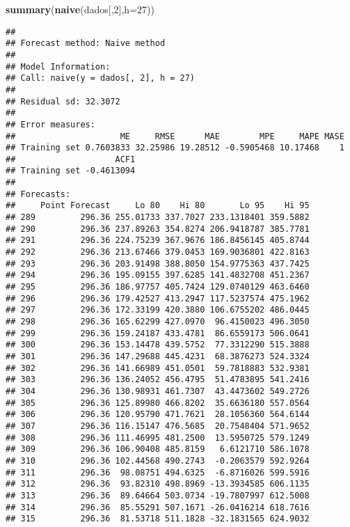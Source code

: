 \documentclass[]{article}
\newenvironment{Shaded}{\begin{snugshade}}{\end{snugshade}}
\newcommand{\DataTypeTok}[1]{\textcolor[rgb]{0.13,0.29,0.53}{#1}}
\newcommand{\DecValTok}[1]{\textcolor[rgb]{0.00,0.00,0.81}{#1}}
\newcommand{\KeywordTok}[1]{\textcolor[rgb]{0.13,0.29,0.53}{\textbf{#1}}}
\newcommand{\NormalTok}[1]{#1}
\begin{document}
\begin{Shaded}
\begin{Highlighting}[]
\KeywordTok{summary}\NormalTok{(}\KeywordTok{naive}\NormalTok{(dados[,}\DecValTok{2}\NormalTok{],}\DataTypeTok{h=}\DecValTok{27}\NormalTok{))}
\end{Highlighting}
\end{Shaded}

\begin{verbatim}
## 
## Forecast method: Naive method
## 
## Model Information:
## Call: naive(y = dados[, 2], h = 27) 
## 
## Residual sd: 32.3072 
## 
## Error measures:
##                     ME     RMSE      MAE        MPE     MAPE MASE
## Training set 0.7603833 32.25986 19.28512 -0.5905468 10.17468    1
##                    ACF1
## Training set -0.4613094
## 
## Forecasts:
##     Point Forecast     Lo 80    Hi 80       Lo 95    Hi 95
## 289         296.36 255.01733 337.7027 233.1318401 359.5882
## 290         296.36 237.89263 354.8274 206.9418787 385.7781
## 291         296.36 224.75239 367.9676 186.8456145 405.8744
## 292         296.36 213.67466 379.0453 169.9036801 422.8163
## 293         296.36 203.91498 388.8050 154.9775363 437.7425
## 294         296.36 195.09155 397.6285 141.4832708 451.2367
## 295         296.36 186.97757 405.7424 129.0740129 463.6460
## 296         296.36 179.42527 413.2947 117.5237574 475.1962
## 297         296.36 172.33199 420.3880 106.6755202 486.0445
## 298         296.36 165.62299 427.0970  96.4150023 496.3050
## 299         296.36 159.24187 433.4781  86.6559173 506.0641
## 300         296.36 153.14478 439.5752  77.3312290 515.3888
## 301         296.36 147.29688 445.4231  68.3876273 524.3324
## 302         296.36 141.66989 451.0501  59.7818883 532.9381
## 303         296.36 136.24052 456.4795  51.4783895 541.2416
## 304         296.36 130.98931 461.7307  43.4473602 549.2726
## 305         296.36 125.89980 466.8202  35.6636180 557.0564
## 306         296.36 120.95790 471.7621  28.1056360 564.6144
## 307         296.36 116.15147 476.5685  20.7548404 571.9652
## 308         296.36 111.46995 481.2500  13.5950725 579.1249
## 309         296.36 106.90408 485.8159   6.6121710 586.1078
## 310         296.36 102.44568 490.2743  -0.2063579 592.9264
## 311         296.36  98.08751 494.6325  -6.8716026 599.5916
## 312         296.36  93.82310 498.8969 -13.3934585 606.1135
## 313         296.36  89.64664 503.0734 -19.7807997 612.5008
## 314         296.36  85.55291 507.1671 -26.0416214 618.7616
## 315         296.36  81.53718 511.1828 -32.1831565 624.9032
\end{verbatim}
\end{document}
